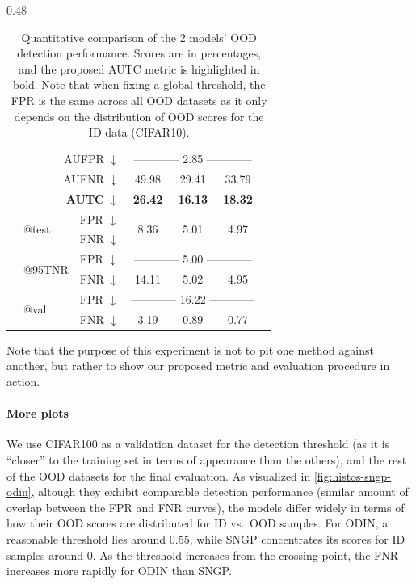 \documentclass[10pt,twocolumn,letterpaper]{article}
\begin{document}
\begin{table}[t]
\begin{subtable}[h]{0.48\textwidth}
\begin{tabular}{@{}lllcccc@{}}
   & \multicolumn{2}{r}{AUFPR $\downarrow$} & \multicolumn{3}{c}{------------ 2.85 ------------}  \\
 & \multicolumn{2}{r}{AUFNR $\downarrow$} & 49.98 & 29.41 & 33.79 \\
 & \multicolumn{2}{r}{\textbf{AUTC} $\downarrow$} & \textbf{26.42} & \textbf{16.13} & \textbf{18.32} \\

\rule{0pt}{0.5cm}

& \multirow{2}{*}{\footnotesize{@test}} & FPR $\downarrow$ & \multirow{2}{*}{8.36} & \multirow{2}{*}{5.01} & \multirow{2}{*}{4.97} \\
&  & FNR $\downarrow$ &  &  &  \\

\rule{0pt}{0.5cm}
 
  & \multirow{2}{*}{\footnotesize{@95TNR}} & FPR $\downarrow$ & \multicolumn{3}{c}{ ------------ 5.00 ------------} \\
 &   & FNR $\downarrow$ & 14.11 & 5.02 & 4.95 \\

 \rule{0pt}{0.5cm}
 
 & \multirow{3}{*}{\footnotesize{@val}} & FPR $\downarrow$ & \multicolumn{3}{c}{------------ 16.22 ------------} \\
 &   & FNR $\downarrow$ & 3.19 & 0.89 & 0.77 \\
\bottomrule
\end{tabular}
\caption{SNGP}
\end{subtable}
\caption{Quantitative comparison of the 2 models' OOD detection performance. Scores are in percentages, and the proposed AUTC metric is highlighted in bold. Note that when fixing a global threshold, the FPR is the same across all OOD datasets as it only depends on the distribution of OOD scores for the ID data (CIFAR10).}
\label{tab:due-odin}
\end{table}


Note that the purpose of this experiment is not to pit one method against another, but rather to show our proposed metric and evaluation procedure in action. 


\paragraph{More plots} We use CIFAR100 as a validation dataset for the detection threshold (as it is ``closer'' to the training set in terms of appearance than the others), and the rest of the OOD datasets for the final evaluation. As visualized in \cref{fig:histos-sngp-odin}, altough they exhibit comparable detection performance (similar amount of overlap between the FPR and FNR curves), the models differ widely in terms of how their OOD scores are distributed for ID vs.~OOD samples. For ODIN, a reasonable threshold lies around 0.55, while SNGP concentrates its scores for ID samples around 0. As the threshold increases from the crossing point, the FNR increases more rapidly for ODIN than SNGP.
\end{document}
